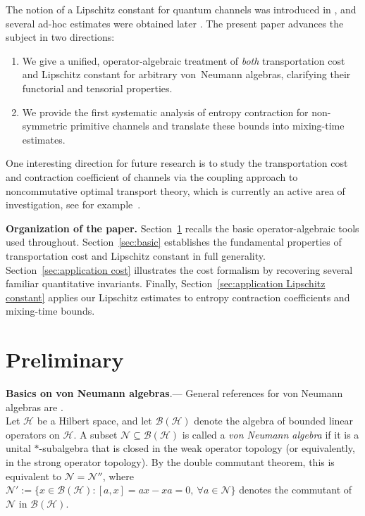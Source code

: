 \documentclass[11pt,reqno]{amsart}
\numberwithin{equation}{section}
\newcommand{\mc}{\mathcal}
\begin{document}
The notion of a Lipschitz constant for quantum channels was introduced in \cite{gaorouze24}, and several ad-hoc estimates were obtained later \cite{rouzé2024optimalquantumalgorithmgibbs}. The present paper advances the subject in two directions:

\begin{enumerate}
\item We give a unified, operator-algebraic treatment of \emph{both} transportation cost and Lipschitz constant for arbitrary von~Neumann algebras, clarifying their functorial and tensorial properties.
\item We provide the first systematic analysis of entropy contraction for non-symmetric primitive channels and translate these bounds into mixing-time estimates.
\end{enumerate}
One interesting direction for future research is to study the transportation cost and contraction coefficient of channels via the coupling approach to noncommutative optimal transport theory, which is currently an active area of investigation, see for example~\cite{biane2000freeprobabilityanaloguewasserstein,D_Andrea_2010, agredo13,caglioti2021optimaltransportquantumdensities, De_Palma_2021, Beatty_2025, anshu2025quantumwassersteindistancesquantum}.

\medskip
\noindent\textbf{Organization of the paper.}
Section~\ref{sec:prelim} recalls the basic operator-algebraic tools used throughout.  
Section~\ref{sec:basic} establishes the fundamental properties of transportation cost and Lipschitz constant in full generality.  
Section~\ref{sec:application cost} illustrates the cost formalism by recovering several familiar quantitative invariants.  
Finally, Section~\ref{sec:application Lipschitz constant} applies our Lipschitz estimates to entropy contraction coefficients and mixing-time bounds.

\section{Preliminary} \label{sec:prelim}
\textbf{Basics on von Neumann algebras}.--- General references for von Neumann algebras are \cite{sakai2012, dixmier2011neumann}.\\ 
Let $\mathcal{H}$ be a Hilbert space, and let $\mathcal{B}(\mathcal{H})$ denote the algebra of bounded linear operators on $\mathcal{H}$. A subset $\mathcal{N} \subseteq \mathcal{B}(\mathcal{H})$ is called a \textit{von Neumann algebra} if it is a unital $*$-subalgebra that is closed in the weak operator topology (or equivalently, in the strong operator topology). By the double commutant theorem, this is equivalent to $\mathcal{N} = \mathcal{N}''$, where $\mathcal{N}':= \{x \in \mc B(\mc H) : [a,x] = ax - xa = 0,\ \forall a\in \mc N\}$ denotes the commutant of $\mathcal{N}$ in $\mathcal{B}(\mathcal{H})$.
\end{document}
